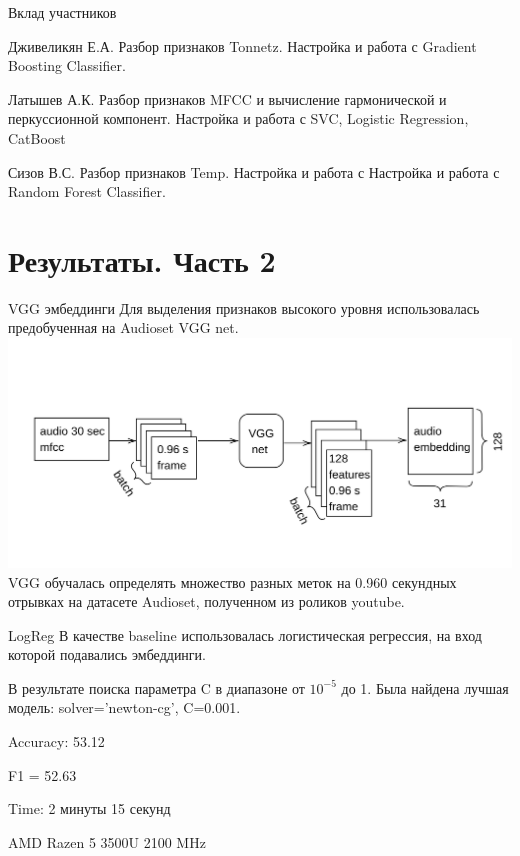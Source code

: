 \documentclass[c, aspectratio = 43]{beamer}
\begin{document}
\begin{frame}{Вклад участников}

\begin{block}{Дживеликян Е.А.}
    Разбор признаков Tonnetz.
    Настройка и работа с Gradient Boosting Classifier.
\end{block}

\begin{block}{Латышев А.К.}
    Разбор признаков MFCC и вычисление гармонической и перкуссионной компонент.
    Настройка и работа с SVC, Logistic Regression, CatBoost
\end{block}

\begin{block}{Сизов В.С.}
    Разбор признаков Temp.
    Настройка и работа с
    Настройка и работа с Random Forest Classifier.
\end{block}

\end{frame}


\section{Результаты. Часть 2}


\begin{frame}{VGG эмбеддинги}
	Для выделения признаков высокого уровня использовалась предобученная на Audioset VGG net.
	\includegraphics[width=\linewidth]{vgg_embed.png}
	VGG обучалась определять множество разных меток на 0.960 секундных отрывках на датасете Audioset, полученном из роликов youtube.
\end{frame}


\begin{frame}{LogReg}
	В качестве baseline использовалась логистическая регрессия, на вход которой подавались эмбеддинги.

	\vspace{0.5cm}
	В результате поиска параметра C в диапазоне от \(10^{-5}\) до 1. Была найдена лучшая модель: solver='newton-cg', C=0.001.
	\vspace{0.5cm}

	Accuracy: 53.12

	F1 = 52.63

	Time: 2 минуты 15 секунд

	AMD Razen 5 3500U 2100 MHz

\end{frame}
\end{document}
